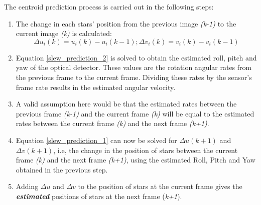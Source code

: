 \documentclass[../../main.tex]{subfiles}
\begin{document}
\begin{itemize}
    \normalsize
     The centroid prediction process is carried out in the following steps:
     \begin{enumerate}
         \item The change in each stars' position from the previous image \emph{(k-1)} to the current image \emph{(k)} is calculated:
         \begin{equation}
             \Delta u_{i}(k) = u_{i}(k) - u_{i}(k-1); \Delta v_{i}(k) = v_{i}(k) - v_{i}(k-1)
         \end{equation}
         
         \item Equation \ref{slew_prediction_2} is solved to obtain the estimated roll, pitch and yaw of the optical detector. These values are the rotation angular rates from the previous frame to the current frame. Dividing these rates by the sensor's frame rate results in the estimated angular velocity. 
         \item A valid assumption here would be that the estimated rates between the previous frame \emph{(k-1)} and the current frame \emph{(k)} will be equal to the estimated rates between the current frame \emph{(k)} and the next frame \emph{(k+1)}. 
        \item Equation \ref{slew_prediction_1} can now be solved for $\Delta u(k+1)$ and $\Delta v(k+1)$, i.e, the change in the position of stars between the current frame \emph{(k)} and the next frame \emph{(k+1)}, using the estimated Roll, Pitch and Yaw obtained in the previous step. 
        \item Adding $\Delta u$ and $\Delta v$ to the position of stars at the current frame gives the \textbf{\emph{estimated}} positions of stars at the next frame (\emph{k+1}). 
     \end{enumerate}
     

\end{itemize}
\end{document}
